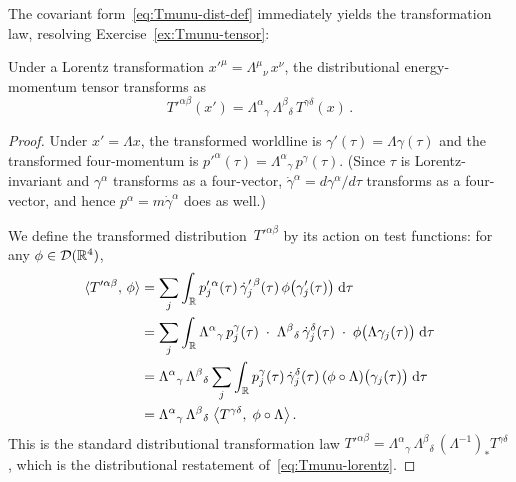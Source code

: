 The covariant form~\eqref{eq:Tmunu-dist-def} immediately yields
the transformation law, resolving
Exercise~\ref{ex:Tmunu-tensor}:

\begin{proposition}\label{prop:lorentz-cov}
  Under a Lorentz transformation
  $x'^\mu = \Lambda^\mu{}_\nu\, x^\nu$, the distributional
  energy-momentum tensor transforms as
  \begin{equation}\label{eq:Tmunu-lorentz}
    T'^{\alpha\beta}(x')
      = \Lambda^\alpha{}_\gamma\,
        \Lambda^\beta{}_\delta\,
        T^{\gamma\delta}(x)\,.
  \end{equation}
\end{proposition}

\begin{proof}
  Under $x' = \Lambda x$, the transformed worldline is
  $\gamma'(\tau) = \Lambda\gamma(\tau)$ and the transformed
  four-momentum is $p'^\alpha(\tau) = \Lambda^\alpha{}_\gamma\,
  p^\gamma(\tau)$.  (Since $\tau$ is Lorentz-invariant and
  $\gamma^\alpha$ transforms as a four-vector,
  $\dot\gamma^\alpha = d\gamma^\alpha/d\tau$ transforms as a
  four-vector, and hence
  $p^\alpha = m\dot\gamma^\alpha$ does as well.)

  We define the transformed distribution~$T'^{\alpha\beta}$ by
  its action on test functions: for any
  $\phi \in \mathcal{D}(\mathbb{R}^{4})$,
  \begin{align}
    \langle T'^{\alpha\beta},\,\phi\rangle
      &= \sum_j \int_{\mathbb{R}} p_j'^{\,\alpha}(\tau)\,
        \dot\gamma_j'^{\,\beta}(\tau)\,
        \phi\bigl(\gamma_j'(\tau)\bigr)\;\mathrm{d}\tau
      \notag\\
      &= \sum_j \int_{\mathbb{R}}
        \Lambda^\alpha{}_\gamma\, p_j^\gamma(\tau)\;\cdot\;
        \Lambda^\beta{}_\delta\, \dot\gamma_j^\delta(\tau)\;\cdot\;
        \phi\bigl(\Lambda\gamma_j(\tau)\bigr)\;\mathrm{d}\tau
      \notag\\
      &= \Lambda^\alpha{}_\gamma\,\Lambda^\beta{}_\delta
        \sum_j \int_{\mathbb{R}} p_j^\gamma(\tau)\,
        \dot\gamma_j^\delta(\tau)\,
        (\phi \circ \Lambda)\bigl(\gamma_j(\tau)\bigr)\;\mathrm{d}\tau
      \notag\\
      &= \Lambda^\alpha{}_\gamma\,\Lambda^\beta{}_\delta\;
        \bigl\langle T^{\gamma\delta},\;
        \phi \circ \Lambda\bigr\rangle\,.
      \label{eq:Tmunu-lorentz-dist}
  \end{align}
  This is the standard distributional transformation law
  $T'^{\alpha\beta} = \Lambda^\alpha{}_\gamma\,
  \Lambda^\beta{}_\delta\,(\Lambda^{-1})_\ast T^{\gamma\delta}$,
  which is the distributional restatement
  of~\eqref{eq:Tmunu-lorentz}.
\end{proof}

